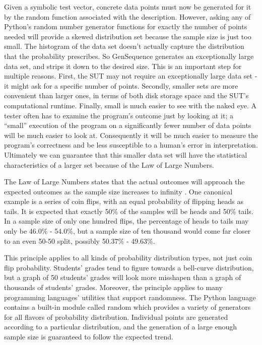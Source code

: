Given a symbolic test vector, concrete data points must now be generated for it by the random function associated with the description. However, asking any of Python's random number generator functions for exactly the number of points needed will provide a skewed distribution set because the sample size is just too small. The histogram of the data set doesn't actually capture the distribution that the probability prescribes. So GenSequence generates an exceptionally large data set, and strips it down to the desired size. This is an important step for multiple reasons. First, the SUT may not require an exceptionally large data set - it might ask for a specific number of points. Secondly, smaller sets are more convenient than larger ones, in terms of both disk storage space and the SUT's computational runtime. Finally, small is much easier to see with the naked eye. A tester often has to examine the program's outcome just by looking at it; a ``small'' execution of the program on a significantly fewer number of data points will be much easier to look at. Consequently it will be much easier to measure the program's correctness and be less susceptible to a human's error in interpretation. Ultimately we can guarantee that this smaller data set will have the statistical characteristics of a larger set because of the Law of Large Numbers.

The Law of Large Numbers states that the actual outcomes will approach the expected outcomes as the sample size increases to infinity . One canonical example is a series of coin flips, with an equal probability of flipping heads as tails. It is expected that exactly 50\% of the samples will be heads and 50\% tails. In a sample size of only one hundred flips, the percentage of heads to tails may only be 46.0\% - 54.0\%, but a sample size of ten thousand would come far closer to an even 50-50 split, possibly 50.37\% - 49.63\%. 

This principle applies to all kinds of probability distribution types, not just coin flip probability. Students’ grades tend to figure towards a bell-curve distribution, but a graph of 50 students’ grades will look more misshapen than a graph of thousands of students’ grades. Moreover, the principle applies to many programming languages’ utilities that support randomness. The Python language contains a built-in module called random which provides a variety of generators for all flavors of probability distribution. Individual points are generated according to a particular distribution, and the generation of a large enough sample size is guaranteed to follow the expected trend.

